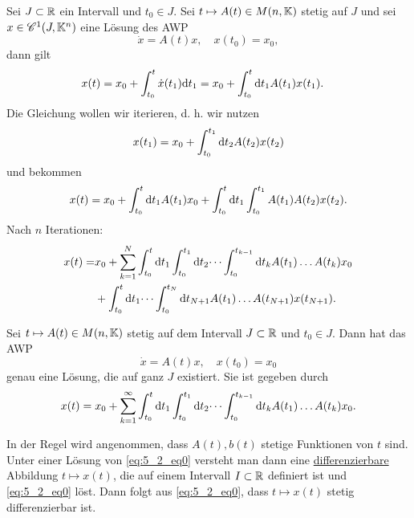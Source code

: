 Sei $J \subset \mathbb{R}$ ein Intervall und $t_0 \in J$. Sei $t \mapsto A(t) \in M(n,\mathbb{K})$ stetig auf $J$ und sei $x \in \mathscr{C}^1(J, \mathbb{K}^n)$ eine Lösung des AWP
\begin{equation}\label{eq:5_2_eq1}
	\dot{x} = A(t)x, \quad x(t_0) = x_0,
\end{equation}
dann gilt
\begin{align*}
	x(t) &= x_0 + \int_{t_0}^t \dot{x}(t_1) \mathrm{d} t_1 = x_0 + \int_{t_0}^t \mathrm{d} t_1 A(t_1)x(t_1).
\end{align*}
Die Gleichung wollen wir iterieren, d. h. wir nutzen 
\[x(t_1) = x_0 + \int_{t_0}^{t_1} \mathrm{d} t_2 A(t_2) x(t_2)\]
und bekommen
\[x(t) = x_0 + \int_{t_0}^{t} \mathrm{d} t_1 A(t_1) x_0 + \int_{t_0}^{t} \mathrm{d} t_1 \int_{t_0}^{t_1} A(t_1) A(t_2) x(t_2).\]
Nach $n$ Iterationen:
\begin{align}\label{eq:5_2_eq2}
	x(t) = &x_0 + \sum_{k=1}^N \int_{t_0}^{t} \mathrm{d} t_1 \int_{t_0}^{t_1} \mathrm{d} t_2 \dots \int_{t_0}^{t_{k-1}} \mathrm{d} t_k A(t_1) \dots A(t_k) x_0\\
	 &+ \int_{t_0}^{t} \mathrm{d} t_1 \dots \int_{t_0}^{t_N} \mathrm{d} t_{N+1} A(t_1)\dots A(t_{N+1}) x(t_{N+1}).\nonumber
\end{align}
\begin{satz}\label{satz5_1}
	Sei $t \mapsto A(t) \in M(n,\mathbb{K})$ stetig auf dem Intervall $J \subset \mathbb{R}$ und $t_0 \in J$. Dann hat das AWP
	\[\dot{x} = A(t)x, \quad x(t_0) = x_0\]
	genau eine Lösung, die auf ganz $J$ existiert. Sie ist gegeben durch 
	\begin{align*}
		x(t) = x_0 + \sum_{k=1}^{\infty} \int_{t_0}^{t} \mathrm{d} t_1 \int_{t_0}^{t_1} \mathrm{d} t_2 \dots \int_{t_0}^{t_{k-1}} \mathrm{d} t_k A(t_1) \dots A(t_k) x_0.
	\end{align*}
\end{satz}
In der Regel wird angenommen, dass $A(t), b(t)$ stetige Funktionen von $t$ sind. Unter einer Lösung von \eqref{eq:5_2_eq0} versteht man dann eine \underline{differenzierbare} Abbildung $t \mapsto x(t)$, die auf einem Intervall $I \subset \mathbb{R}$ definiert ist und \eqref{eq:5_2_eq0} löst. Dann folgt aus \eqref{eq:5_2_eq0}, dass $t \mapsto x(t)$ stetig differenzierbar ist.


